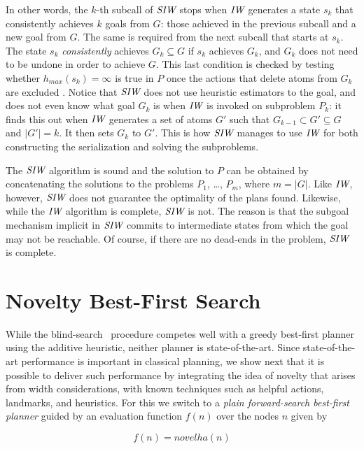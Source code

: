 \documentclass[letterpaper]{article}
\begin{document}
{  In other words, the $k$-th subcall of ${\textit{SIW}}$ stops when ${\textit{IW}}$ generates
  a state $s_k$ that consistently achieves $k$ goals from $G$: those
  achieved in the previous subcall and a new goal from $G$. The same is
  required from the next subcall that starts at $s_k$.  The state $s_k$
  \emph{consistently} achieves $G_k \subseteq G$ if $s_k$ achieves
  $G_k$, and $G_k$ does not need to be undone in order to achieve
  $G$. This last condition is checked by testing whether
  $h_{max}(s_k)=\infty$ is true in $P$ once the actions that delete
  atoms from $G_k$ are excluded \cite{bonet:aij-hsp}.  Notice that ${\textit{SIW}}$
  does not use heuristic estimators to the goal, and does not even know
  what goal $G_k$ is when ${\textit{IW}}$ is invoked on subproblem $P_k$: it finds
  this out when ${\textit{IW}}$ generates a set of atoms $G'$ such that $G_{k-1}
  \subset G' \subseteq G$ and $|G'|=k$. It then sets $G_k$ to $G'$. This
  is how ${\textit{SIW}}$ manages to use ${\textit{IW}}$ for both constructing the
  serialization and solving the subproblems.

  The ${\textit{SIW}}$ algorithm is sound and the solution to $P$ can be obtained by concatenating the
  solutions to the problems $P_1$, \ldots, $P_m$, where $m = |G|$. Like ${\textit{IW}}$, however,
  ${\textit{SIW}}$ does not guarantee the optimality of the plans found.
  Likewise, while the ${\textit{IW}}$ algorithm is complete, ${\textit{SIW}}$ is not.  The reason is that the subgoal
  mechanism implicit in ${\textit{SIW}}$ commits to intermediate states from which the goal may not be reachable.
  Of course, if there are no dead-ends in the problem, ${\textit{SIW}}$ is complete.

}

\section{Novelty Best-First Search}


While the blind-search \SR\ procedure competes well with a greedy
best-first planner using the additive heuristic, neither planner is
state-of-the-art. Since state-of-the-art performance is important in
classical planning, we show next that it is possible to deliver such
performance by integrating the idea of novelty that arises from width
considerations, with known techniques such as helpful actions,
landmarks, and heuristics. For this we switch to a \emph{plain
  forward-search best-first planner} guided by an evaluation function
$f(n)$ over the nodes $n$ given by

\begin{equation}
 f(n) =   novelha(n) 
\label{f}
\end{equation}
\end{document}
